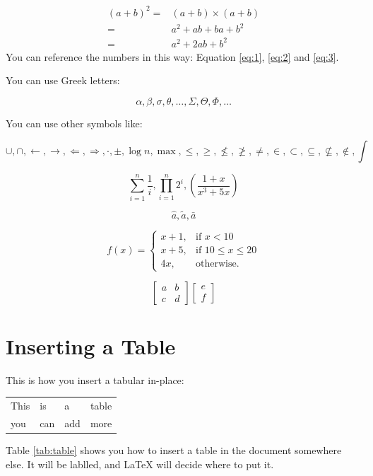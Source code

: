 \documentclass{article}[12pt]
\begin{document}
\begin{align}
  (a+b)^2=& (a+b)\times(a+b) \label{eq:1}\\
  =& a^2+ab+ba+b^2 \label{eq:2}\\
  =&a^2+2ab+b^2 \label{eq:3}
\end{align}
You can reference the numbers in this way: Equation \ref{eq:1}, \ref{eq:2} and \ref{eq:3}.

You can use Greek letters:

$$\alpha, \beta, \sigma, \theta, \dots, \Sigma, \Theta, \Phi, \dots$$

You can use other symbols like:

$$\cup, \cap, \leftarrow, \rightarrow, \Leftarrow, \Rightarrow, \cdot, \pm, \log n, \max, \le, \ge, \nleq, \ngeq, \neq,\in,\subset,\subseteq,\nsubseteq,\notin,\int$$

$$\sum_{i=1}^{n}\frac{1}{i}, \prod_{i=1}^{n} 2^{i}, \left( \frac{1+x}{x^3+5x}\right)$$

$$\hat{a}, \tilde{a}, \bar{a}$$

$$f(x)=\begin{cases}
         x+1, & \mbox{if } x<10 \\
         x+5, & \mbox{if } 10\le x \le 20 \\
         4x, & \mbox{otherwise}.
       \end{cases}$$

$$\begin{bmatrix}
    a & b \\
    c & d
  \end{bmatrix}
\begin{bmatrix}
    e \\
    f
  \end{bmatrix}
$$

\section{Inserting a Table}

This is how you insert a tabular in-place:

\begin{tabular}{|l|l|l|l|}
  \hline
    This & is &a&table\\
    you  & can & add & more \\
  \hline
\end{tabular}

Table \ref{tab:table} shows you how to insert a table in the document somewhere else. It will be lablled, and LaTeX will decide where to put it.
\end{document}
